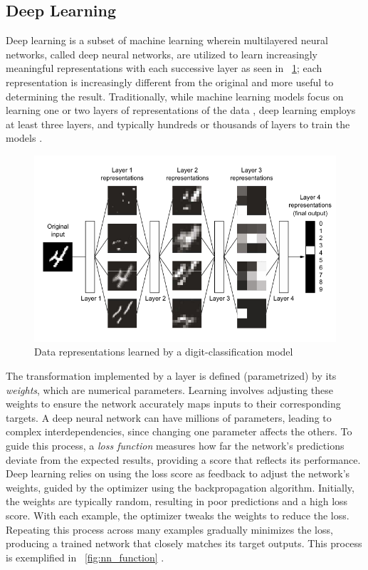 \documentclass[licencjacka,en]{pracamgr}
\begin{document}
\subsection{Deep Learning}
Deep learning is a subset of machine learning wherein multilayered neural networks, called deep neural networks, are utilized to learn increasingly meaningful representations with each successive layer as seen in ~\ref{fig:nn_simple}; each representation is increasingly different from the original and more useful to determining the result. Traditionally, while machine learning models focus on learning one or two layers of representations of the data \cite{francuz_8}, deep learning employs at least three layers, and typically hundreds or thousands of layers to train the models \cite{ibm_dl}.

\begin{figure}
    \centering
    \includegraphics[width=0.5\linewidth]{bachelor_images/nn_simple.png}
    \caption{Data representations learned by a digit-classification model \cite{francuz_8}}
    \label{fig:nn_simple}
\end{figure}

The transformation implemented by a layer is defined (parametrized) by its \textit{weights}, which are numerical parameters. Learning involves adjusting these weights to ensure the network accurately maps inputs to their corresponding targets. A deep neural network can have millions of parameters, leading to complex interdependencies, since changing one parameter affects the others. To guide this process, a \textit{loss function} measures how far the network's predictions deviate from the expected results, providing a score that reflects its performance. Deep learning relies on using the loss score as feedback to adjust the network's weights, guided by the optimizer using the backpropagation algorithm. Initially, the weights are typically random, resulting in poor predictions and a high loss score. With each example, the optimizer tweaks the weights to reduce the loss. Repeating this process across many examples gradually minimizes the loss, producing a trained network that closely matches its target outputs. This process is exemplified in ~\ref{fig:nn_function} \cite{francuz_9}.
\end{document}
